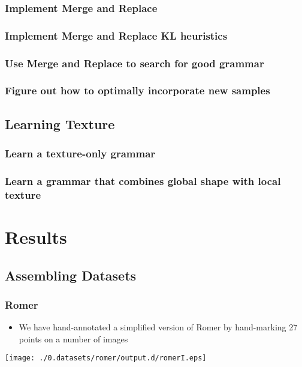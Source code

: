 \documentclass{book}
\begin{document}
\subsection{Implement Merge and Replace}
\label{sec-1_7_2}
\subsection{Implement Merge and Replace KL heuristics}
\label{sec-1_7_3}
\subsection{Use Merge and Replace to search for good grammar}
\label{sec-1_7_4}
\subsection{Figure out how to optimally incorporate new samples}
\label{sec-1_7_5}
\section{Learning Texture}
\label{sec-1_8}
\subsection{Learn a texture-only grammar}
\label{sec-1_8_1}
\subsection{Learn a grammar that combines global shape with local texture}
\label{sec-1_8_2}
\chapter{Results}
\label{sec-2}

\setcounter{section}{-1}
\section{Assembling Datasets}
\label{sec-2_1}
\subsection{Romer}
\label{sec-2_1_1}

\begin{itemize}
\item We have hand-annotated a simplified version of Romer by
    hand-marking 27 points on a number of images
\end{itemize}
\texttt{[image: ./0.datasets/romer/output.d/romerI.eps]}
\end{document}
